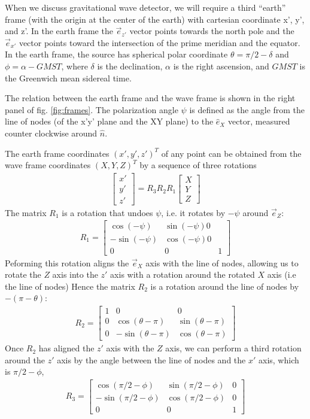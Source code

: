 \documentclass[aps,prd,amsmath,showpacs,amssymb,superscriptaddress,nofootinbib,longbibliography,eqsecnum,preprintnumbers]{revtex4-1}
\begin{document}
When we discuss gravitational wave detector, we will require a third ``earth'' frame (with the origin at the center of the earth) with cartesian coordinate x', y', and z'. In the earth frame the $\vec e_{z'}$ vector points towards the north pole and the $\vec e_{x'}$ vector points toward the intersection of the prime meridian and the equator. In the earth frame, the source has spherical polar coordinate $\theta =\pi/2 -\delta$ and $\phi=\alpha-GMST$, where $\delta$ is the declination, $\alpha$ is the right ascension, and $GMST$ is the Greenwich mean sidereal time.

The relation between the earth frame and the wave frame is shown in the right panel of fig. \ref{fig:frames}. The polarization angle $\psi$ is defined as the angle from the line of nodes (of the x'y' plane and the XY plane) to the $\hat e_X$ vector, measured counter clockwise around $\hat n$. 

The earth frame coordinates $(x',y',z')^T$ of any point can be obtained from the wave frame coordinates $(X,Y,Z)^T$ by a sequence of three rotations
\begin{align}
\begin{bmatrix}
x' \\ y' \\z'
\end{bmatrix}
=R_3R_2R_1\begin{bmatrix}
X\\ Y \\Z
\end{bmatrix}
\end{align}
The matrix $R_1$ is a rotation that undoes $\psi$, i.e. it rotates by $-\psi$ around $\vec e_Z$:
\begin{align}
R_1=\begin{bmatrix}
\cos (-\psi) & \sin (-\psi) 0 \\
-\sin (-\psi) &\cos (-\psi) 0 \\
0 & 0 &1
\end{bmatrix}
\end{align}
Peforming this rotation aligns the $\vec e_X$ axis with the line of nodes, allowing us to rotate the $Z$ axis into the $z'$ axis with a rotation around the rotated $X$ axis (i.e the line of nodes)
Hence the matrix $R_2$ is a rotation around the line of nodes by $-(\pi-\theta)$:
\begin{align}
R_2=
\begin{bmatrix}
1 &0 & 0 \\
0 &\cos(\theta -\pi) & \sin(\theta-\pi) \\
0 & -\sin(\theta-\pi) & \cos(\theta -\pi)
\end{bmatrix}
\end{align}
Once $R_2$ has aligned the $z'$ axis with the $Z$ axis, we can perform a third rotation around the $z'$ axis by the angle between the line of nodes and the $x'$ axis, which is $\pi/2 -\phi$,
\begin{align}
R_3=
\begin{bmatrix}
\cos (\pi/2-\phi) & \sin(\pi/2-\phi) &0 \\
-\sin (\pi/2-\phi) & \cos(\pi/2-\phi) & 0 \\ 
0 & 0 & 1
\end{bmatrix}
\end{align}
\end{document}
